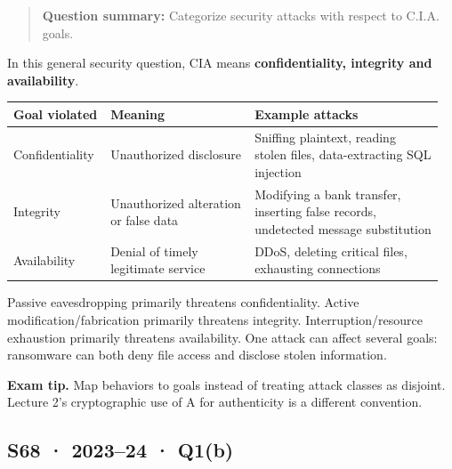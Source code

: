\documentclass[11pt,a4paper]{article}
\begin{document}
\begin{quote}\small

\textbf{Question summary:} Categorize security attacks with respect to C.\allowbreak{}I.\allowbreak{}A. goals.



\end{quote}

In this general security question,\allowbreak{} CIA means \textbf{confidentiality,\allowbreak{} integrity and availability}.



{\small\setlength{\tabcolsep}{3pt}
\begin{longtable}{>{\raggedright\arraybackslash}p{0.20601\linewidth}>{\raggedright\arraybackslash}p{0.32356\linewidth}>{\raggedright\arraybackslash}p{0.42885\linewidth}}
\toprule
\textbf{Goal violated} & \textbf{Meaning} & \textbf{Example attacks} \\
\midrule
\endhead
Confidentiality & Unauthorized disclosure & Sniffing plaintext,\allowbreak{} reading stolen files,\allowbreak{} data-extracting SQL injection \\
Integrity & Unauthorized alteration or false data & Modifying a bank transfer,\allowbreak{} inserting false records,\allowbreak{} undetected message substitution \\
Availability & Denial of timely legitimate service & DDoS,\allowbreak{} deleting critical files,\allowbreak{} exhausting connections \\
\bottomrule
\end{longtable}
}

Passive eavesdropping primarily threatens confidentiality. Active modification/\allowbreak{}fabrication primarily threatens integrity. Interruption/\allowbreak{}resource exhaustion primarily threatens availability. One attack can affect several goals: ransomware can both deny file access and disclose stolen information.



{\color{ForestGreen}\textbf{Exam tip.} Map behaviors to goals instead of treating attack classes as disjoint. Lecture 2’s cryptographic use of A for authenticity is a different convention.}




\clearpage
\subsection{S68 · 2023–24 · Q1(b)}\label{s68}
\end{document}
